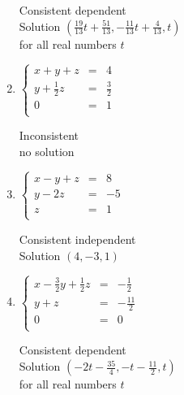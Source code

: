 \documentclass{ximera}
\begin{document}
\begin{enumerate}
Consistent dependent\\
Solution $\left(\frac{19}{13} t + \frac{51}{13},-\frac{11}{13} t+\frac{4}{13},t\right)$\\
for all real numbers $t$


\item $\left\{ \begin{array}{rcr} x+y+z & = & 4  \\ y + \frac{1}{2} z & = & \frac{3}{2} \\ 0 & = & 1 \\  \end{array} \right.$
\vspace{.25in}

Inconsistent\\
no solution



\item $\left\{ \begin{array}{rcr} x-  y +  z & = & 8  \\ y -2z & = & -5 \\ z & = & 1 \\  \end{array} \right.$
\vspace{.25in}

Consistent independent\\
Solution $\left(4,-3,1\right)$




\item $\left\{ \begin{array}{rcr} x- \frac{3}{2} y + \frac{1}{2} z & = & -\frac{1}{2}  \\[3pt] y +  z & = & -\frac{11}{2} \\ 0 & = & 0 \\  \end{array} \right.$
\vspace{.25in}

Consistent dependent\\
Solution $\left(-2t - \frac{35}{4},-t - \frac{11}{2},t\right)$\\
for all real numbers $t$


\end{enumerate}
\end{document}
